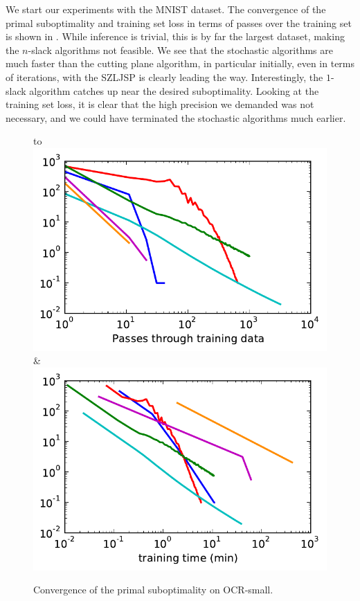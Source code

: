 We start our experiments with the MNIST dataset.
The convergence of the primal suboptimality and training set loss in terms of
passes over the training set is shown in . While inference
is trivial, this is by far the largest dataset, making the $n$-slack algorithms
not feasible. We see that the stochastic algorithms are much faster than the
cutting plane algorithm, in particular initially, even in terms of iterations,
with the SZLJSP is clearly leading the way. Interestingly, the $1$-slack algorithm
catches up near the desired suboptimality. Looking at the training set loss,
it is clear that the high precision we demanded was not necessary, and we could have
terminated the stochastic algorithms much earlier.


\begin{figure}
    \begin{tabu} to 
    \\[-3mm]
    \includegraphics[width=\linewidth]{evaluation/images/letters_small_log}&%
    \includegraphics[width=\linewidth]{evaluation/images/letters_small_log_time}
    \end{tabu}
\caption{%
   Convergence of the primal suboptimality on OCR-small. 
}
\end{figure}

